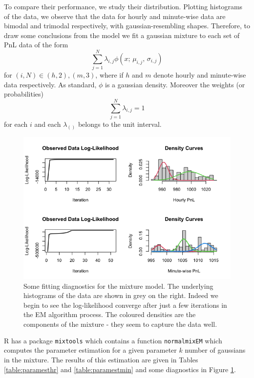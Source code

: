 \documentclass[twoside]{report}
\newcommand{\code}{\texttt}
\begin{document}
\begin{spacing}{1}
To compare their performance, we study their distribution. Plotting histograms of the data, we observe that the data for hourly and minute-wise data are bimodal and trimodal respectively, with gaussian-resembling shapes. Therefore, to draw some conclusions from the model we fit a gaussian mixture to each set of PnL data of the form \[
\sum_{j=1}^N \lambda_{i,j}\phi(x;\,\mu_{i,j},\, \sigma_{i,j})
\]
for $(i,N) \in {(h,2), (m,3)}$, where if $h$ and $m$ denote hourly and minute-wise data respectively. As standard, $\phi$ is a gaussian density. Moreover the weights (or probabilities) \[
\sum_{j=1}^N \lambda_{i,j} = 1
\]
for each $i$ and each $\lambda_{()}$ belongs to the unit interval.

\begin{figure}
    \centering
    \includegraphics[width=\linewidth]{Reddit_Analysis/Network_Analysis/mixture_model_fitting.png}
    \caption{Some fitting diagnostics for the mixture model. The underlying histograms of the data are shown in grey on the right. Indeed we begin to see the log-likelihood converge after just a few iterations in the EM algorithm process. The coloured densities are the components of the mixture - they seem to capture the data well.}
    \label{fig:mixture_model_fitting}
\end{figure}

R has a package \code{mixtools} which contains a function \code{normalmixEM} which computes the parameter estimation for a given parameter $k$ number of gaussians in the mixture. The results of this estimation are given in Tables \ref{table:paramesthr} and \ref{table:paramestmin} and some diagnostics in Figure \ref{fig:mixture_model_fitting}.




\end{spacing}
\end{document}
